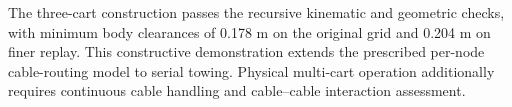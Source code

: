 The three-cart construction passes the recursive kinematic and geometric checks, with minimum body clearances of 0.178 m on the original grid and 0.204 m on finer replay. This constructive demonstration extends the prescribed per-node cable-routing model to serial towing. Physical multi-cart operation additionally requires continuous cable handling and cable--cable interaction assessment.
